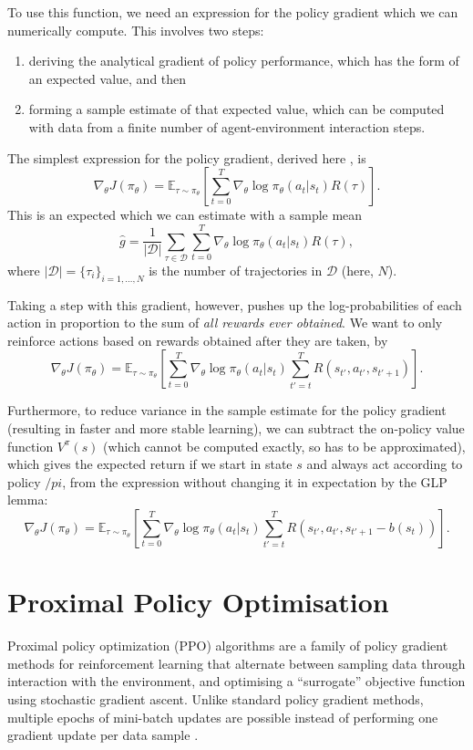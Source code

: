 \documentclass{article}
\begin{document}
To use this function, we need an expression for the policy gradient which we can numerically compute. This involves two steps:
\begin{enumerate}
  \item deriving the analytical gradient of policy performance, which has the form of an expected value, and then
  \item forming a sample estimate of that expected value, which can be computed with data from a finite number of agent-environment interaction steps.
\end{enumerate}

The simplest expression for the policy gradient, derived here \cite{}, is $$\nabla_\theta J(\pi_\theta) = \mathbb{E}_{\tau \sim \pi_\theta} \left[ \sum_{t=0}^T \nabla_\theta \log \pi_\theta(a_t | s_t) R(\tau) \right].$$ This is an expected which we can estimate with a sample mean $$\hat{g} = \frac{1}{\lvert \mathcal{D} \rvert} \sum_{\tau \in \mathcal{D}} \sum_{t=0}^T \nabla_\theta \log \pi_\theta(a_t | s_t) R(\tau),$$ where $\lvert \mathcal{D} \rvert = \{ \tau_i \}_{i=1, \dots, N}$ is the number of trajectories in $\mathcal{D}$ (here, $N$).

Taking a step with this gradient, however, pushes up the log-probabilities of each action in proportion to the sum of \textit{all rewards ever obtained}. We want to only reinforce actions based on rewards obtained after they are taken, by $$\nabla_\theta J(\pi_\theta) = \mathbb{E}_{\tau \sim \pi_\theta} \left[ \sum_{t=0}^T \nabla_\theta \log \pi_\theta(a_t | s_t) \sum_{t'=t}^T R(s_{t'}, a_{t'}, s_{t'+1}) \right].$$

Furthermore, to reduce variance in the sample estimate for the policy gradient (resulting in faster and more stable learning), we can subtract the on-policy value function $V^\pi(s)$ (which cannot be computed exactly, so has to be approximated), which gives the expected return if we start in state $s$ and always act according to policy $/pi$, from the expression without changing it in expectation by the GLP lemma: $$\nabla_\theta J(\pi_\theta) = \mathbb{E}_{\tau \sim \pi_\theta} \left[ \sum_{t=0}^T \nabla_\theta \log \pi_\theta(a_t | s_t) \sum_{t'=t}^T R \left( s_{t'}, a_{t'}, s_{t'+1} - b(s_t)\right) \right].$$ 

\section{Proximal Policy Optimisation}

Proximal policy optimization (PPO) algorithms are a family of policy gradient methods for reinforcement learning that alternate between sampling data through interaction with the environment, and optimising a ``surrogate'' objective function using stochastic gradient ascent. Unlike standard policy gradient methods, multiple epochs of mini-batch updates are possible instead of performing one gradient update per data sample \cite{DBLP:journals/corr/SchulmanWDRK17}.
\end{document}
